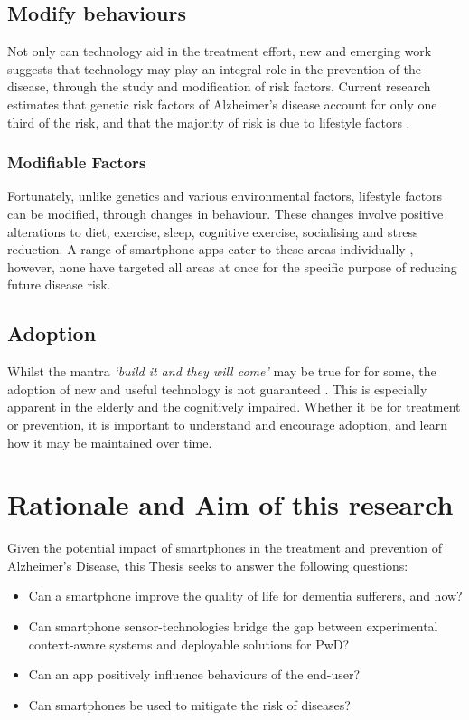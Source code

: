 \subsection{Modify behaviours}
Not only can technology aid in the treatment effort, new and emerging work suggests that technology may play an integral role in the prevention of the disease, through the study and modification of risk factors. Current research estimates that genetic risk factors of Alzheimer's disease account for only one third of the risk, and that the majority of risk is due to lifestyle factors \cite{Ridge2013}. 

\subsubsection{Modifiable Factors}
Fortunately, unlike genetics and various environmental factors, lifestyle factors can be modified, through changes in behaviour. These changes involve positive alterations to diet, exercise, sleep, cognitive exercise, socialising and stress reduction. A range of smartphone apps cater to these areas individually \cite{Steinhubl2015, Stoyanov2015}, however, none have targeted all areas at once for the specific purpose of reducing future disease risk.

\subsection{Adoption}
Whilst the mantra \textit{`build it and they will come'} may be true for for some, the adoption of new and useful technology is not guaranteed \cite{Bradley2012}. This is especially apparent in the elderly and the cognitively impaired. Whether it be for treatment or prevention, it is important to understand and encourage adoption, and learn how it may be maintained over time.

\section{Rationale and Aim of this research}
Given the potential impact of smartphones in the treatment and prevention of Alzheimer's Disease, this Thesis seeks to answer the following questions:
\begin{itemize}
	\item Can a smartphone improve the quality of life for dementia sufferers, and how?
	\item Can smartphone sensor-technologies bridge the gap between experimental context-aware systems and deployable solutions for PwD?  
	\item Can an app positively influence behaviours of the end-user?
	\item Can smartphones be used to mitigate the risk of diseases?
\end{itemize}

